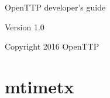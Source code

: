 \documentclass[11pt,a4paper,openany,oneside]{book}
\begin{document}
\begin{titlepage}

\begin{center}
{\Huge OpenTTP developer's guide}
\end{center}

\vspace*{4cm}
\begin{center}
Version 1.0
\end{center}

\begin{center}
Copyright 2016 OpenTTP
\end{center}

\end{titlepage}

\tableofcontents
\listoffigures
\listoftables

\lstset{
	xleftmargin=24pt,
	basewidth=0.5em,
	basicstyle=\ttfamily,
	escapechar=\%
}

\chapter{mtimetx}


\end{document}
